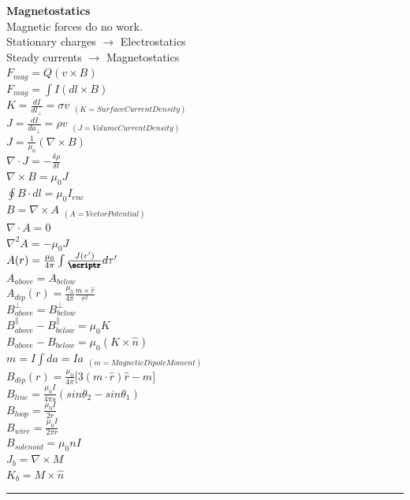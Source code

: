 \documentclass[1pt]{report}
\begin{document}
\begin{multicols}{3}
\begin{flushleft}
\textbf{Magnetostatics}\\
Magnetic forces do no work.\\
Stationary charges $\rightarrow$ Electrostatics\\
Steady currents $\rightarrow$ Magnetostatics\\
$F_{mag}=Q(v\times B)$\\
$F_{mag}=\int I(dl\times B)$\\
$K=\frac{dI}{dl_\perp}=\sigma v$ $_{(K=Surface Current Density)}$\\
$J=\frac{dI}{da_\perp}=\rho v$ $_{(J=Volume Current Density)}$\\
$J=\frac{1}{\mu_0}(\nabla\times B)$\\
$\nabla\cdot J=-\frac{\delta\rho}{\delta t}$\\
$\nabla\times B=\mu_0J$\\
$\oint B\cdot dl=\mu_0 I_{enc}$\\
$B=\nabla\times A$ $_{(A=Vector Potential)}$\\
$\nabla\cdot A=0$\\
$\nabla^2A=-\mu_0J$\\
$A(r)=\frac{\mu_0}{4\pi}\int\frac{J(r')}{{\pmb{\scriptr}}}d\tau'$\\
$A_{above}=A_{below}$\\
$A_{dip}(r)=\frac{\mu_0}{4\pi}\frac{m\times\hat{r}}{r^2}$\\
$B^{\perp}_{above}=B^{\perp}_{below}$\\
$B^{\parallel}_{above}-B^{\parallel}_{below}=\mu_0K$\\
$B_{above}-B_{below}=\mu_0(K\times\hat{n})$\\
$m=I\int da=Ia$ $_{(m=MagneticDipoleMoment)}$\\
$B_{dip}(r)=\frac{\mu_0}{4\pi}\lbrack 3(m\cdot\hat{r})\hat{r}-m\rbrack$\\
$B_{line}=\frac{\mu_0I}{4\pi s}(sin\theta_2-sin\theta_1)$\\
$B_{loop}=\frac{\mu_0 I}{2r}$\\
$B_{wire}=\frac{\mu_0 I}{2\pi r}$\\
$B_{solenoid}=\mu_0nI$\\
$J_b=\nabla\times M$\\
$K_b=M\times\hat{n}$\\

\noindent\rule[0.5ex]{\linewidth}{1pt}


\end{flushleft}
\end{multicols}
\end{document}
